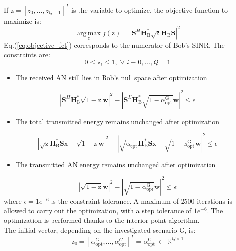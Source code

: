 \documentclass[journal,comsoc]{IEEEtran}
\newcommand{\module}[1]{\left|#1\right|}
\newcommand{\HB}{\textbf{H}_{\text{B}}}
\newcommand{\spread}{\textbf{S}}
\newcommand{\w}{\textbf{w}}
\newcommand{\mat}[1]{\boldsymbol{\mathrm{#1}}}
\begin{document}
If $\mat{z} = [z_0,...,z_{Q-1}]^T$ is the variable to optimize, the objective function to maximize is:
\begin{equation}
	\operatorname*{arg\,max}_z  f(\mat{z}) = \left| \spread^H \HB^* \sqrt{\mat{z}} \HB \spread \right|^2
	\label{eq:objective_fct}
\end{equation}
Eq.(\ref{eq:objective_fct}) corresponds to the numerator of Bob's SINR. The constraints are:
\begin{equation}
0 \leq z_i \leq 1 , \; \forall \; i = 0,...,Q-1  \label{eq:constraint1}
\end{equation}
\begin{itemize}
	\item The received AN still lies in Bob's null space after optimization
\end{itemize}
\begin{equation}
\left| \spread^H \HB^* \sqrt{\mat{1}- \mat{z}} \w  \right|^2 -  \left| \spread^H \HB^* \sqrt{\mat{1}- \mat{\alpha_{\text{opt}}^G}} \w  \right|^2 \leq \epsilon \label{eq:constraint2}
\end{equation}
\begin{itemize}
	\item The total transmitted energy remains unchanged after optimization
\end{itemize}
\begin{equation}
\module{\sqrt{\mat{z}} \HB^* \spread \mat{x} + \sqrt{\mat{1}-\mat{z}}\w }^2   - \module{\sqrt{\mat{\alpha_{\text{opt}}^G}}  \HB^* \spread \mat{x} + \sqrt{1-\mat{\alpha_{\text{opt}}^G}} \w }^2 \leq \epsilon \label{eq:constraint3}
\end{equation}
\begin{itemize}
	\item The transmitted AN energy remains unchanged after optimization
\end{itemize}
\begin{equation}
	\module{\sqrt{\mat{1}- \mat{z}}\w}^2 - \module{\sqrt{\mat{1}- \mat{\alpha_{\text{opt}}^G}}\w}^2 \leq \epsilon \label{eq:constraint4}
\end{equation}
where $\epsilon = 1e^{-6}$ is the constraint tolerance. A maximum of 2500 iterations is allowed to carry out the optimization, with a step tolerance of $1e^{-6}$. The optimization is performed thanks to the interior-point algorithm. \\
The initial vector, depending on the investigated scenario $\mat{G}$, is:
\begin{equation}
	\mat{z}_0 =\left[\alpha_{\text{opt}}^G , ... ,\alpha_{\text{opt}}^G \right]^T = \mat{\alpha_{\text{opt}}^G} \; \in \; \mathbb{R}^{Q\times 1}
\end{equation}
\end{document}
